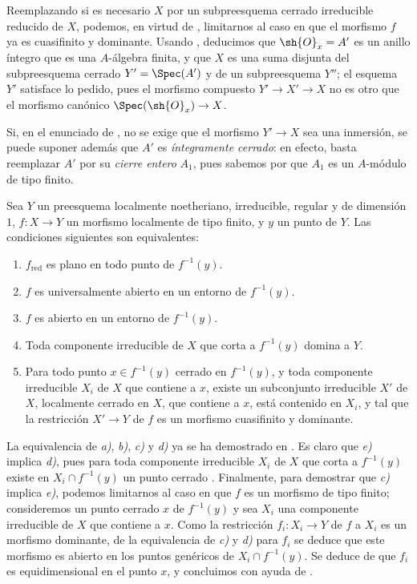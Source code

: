 Reemplazando si es necesario $X$ por un subpreesquema cerrado irreducible reducido de $X$, podemos, en virtud de , limitarnos al caso en que el morfismo $f$ ya es cuasifinito y dominante.
Usando , deducimos que $\sh{O}_x=A'$ es un anillo íntegro que es una $A$-álgebra finita, y que $X$ es una suma disjunta del subpreesquema cerrado $Y'=\Spec(A')$ y de un subpreesquema $Y''$; el esquema $Y'$ satisface lo pedido, pues el morfismo compuesto $Y'\to X'\to X$ no es otro que el morfismo canónico $\Spec(\sh{O}_x)\to X$.

\begin{remark}[14.5.5]
\label{IV.14.5.5}
Si, en el enunciado de , no se exige que el morfismo $Y'\to X$ sea una inmersión, se puede suponer además que $A'$ es \emph{íntegramente cerrado}: en efecto, basta reemplazar $A'$ por su \emph{cierre entero} $A_1$, pues sabemos por  que $A_1$ es un $A$-módulo de tipo finito.
\end{remark}

\begin{proposition}[14.5.6]
\label{IV.14.5.6}
Sea $Y$ un preesquema localmente noetheriano, irreducible, regular y de dimensión $1$, $f:X\to Y$ un morfismo localmente de tipo finito, y $y$ un punto de $Y$.
Las condiciones siguientes son equivalentes:
\begin{enumerate}[label=\emph{\alph*)}]
  \item $f_{\mathrm{red}}$ es plano en todo punto de $f^{-1}(y)$.
  \item $f$ es universalmente abierto en un entorno de $f^{-1}(y)$.
  \item $f$ es abierto en un entorno de $f^{-1}(y)$.
  \item Toda componente irreducible de $X$ que corta a $f^{-1}(y)$ domina a $Y$.
  \item Para todo punto $x\in f^{-1}(y)$ cerrado en $f^{-1}(y)$, y toda componente irreducible $X_i$ de $X$ que contiene a $x$, existe un subconjunto irreducible $X'$ de $X$, localmente cerrado en $X$, que contiene a $x$, está contenido en $X_i$, y tal que la restricción $X'\to Y$ de $f$ es un morfismo cuasifinito y dominante.
\end{enumerate}
\end{proposition}

La equivalencia de \emph{a)}, \emph{b)}, \emph{c)} y \emph{d)} ya se ha demostrado en .
Es claro que \emph{e)} implica \emph{d)}, pues para toda componente irreducible $X_i$ de $X$ que corta a $f^{-1}(y)$ existe en $X_i\cap f^{-1}(y)$ un punto cerrado .
Finalmente, para demostrar que \emph{c)} implica \emph{e)}, podemos limitarnos al caso en que $f$ es un morfismo de tipo finito; consideremos un punto cerrado $x$ de $f^{-1}(y)$ y sea $X_i$ una componente irreducible de $X$ que contiene a $x$.
Como la restricción $f_i:X_i\to Y$ de $f$ a $X_i$ es un morfismo dominante, de la equivalencia de \emph{c)} y \emph{d)} para $f_i$ se deduce que este morfismo es abierto en los puntos genéricos de $X_i\cap f^{-1}(y)$. Se deduce de  que $f_i$ es equidimensional en el punto $x$, y concluimos con ayuda de .

